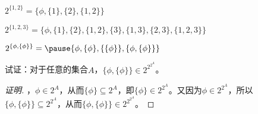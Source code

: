 \documentclass{beamer}
\begin{document}
\begin{CJK*}{UTF8}{gbsn}
\begin{frame}
\begin{Ex}
  $2^{\{1,2\}}=\{\phi, \{1\},\{2\},\{1,2\}\}$
  
  $2^{\{1,2,3\}}=\{\phi, \{1\},\{2\},\{1,2\},\{3\},\{1,3\},\{2,3\},\{1,2,3\}\}$
\end{Ex}
\end{frame}
\begin{frame}
  \begin{Ex}
    $2^{\{\phi, \{\phi\}\}}=\pause\{\phi, \{\phi\},\{\{\phi\}\}, \{\phi, \{\phi\}\}\}$
  \end{Ex}
\end{frame}
\begin{frame}
    试证：对于任意的集合$A$，${\{\phi, \{\phi\}\}} \in 2^{2^{2^{A}}}$。
  \begin{proof}[证明]
    ，\pause $\phi \in 2^{A}$，\pause 从而$\{\phi\} \subseteq 2^{A}$，\pause 即$\{\phi\} \in 2^{2^A}$。\pause 又因为$\phi \in 2^{2^{A}}$，\pause 所以$\{\phi, \{\phi\}\}\subseteq 2^{2^{A}}$，\pause 从而$\{\phi, \{\phi\}\}\in 2^{2^{2^{A}}}$。
  \end{proof}
\end{frame}

\end{CJK*}
\end{document}
